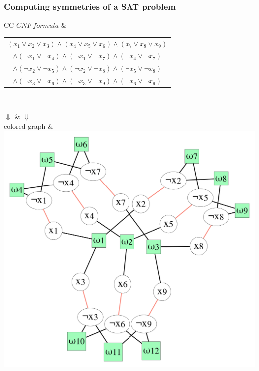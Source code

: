 \documentclass{beamer}
\begin{document}
\begin{frame}
\frametitle{Computing symmetries of a SAT problem}

\begin{tabular}{CC}
	$CNF\ formula$ &{\scriptsize
		\begin{tabular}{c}
			$(x_1 \lor x_2 \lor x_3) \land
			(x_4 \lor x_5 \lor x_6) \land
			(x_7 \lor x_8 \lor x_9) $\\
			$\land (\neg x_1 \lor \neg x_4) \land
			(\neg x_1 \lor \neg x_7) \land
			(\neg x_4 \lor \neg x_7)$\\
			$\land (\neg x_2 \lor \neg x_5) \land
			(\neg x_2 \lor \neg x_8) \land
			(\neg x_5 \lor \neg x_8)$ \\
			$\land (\neg x_3 \lor \neg x_6) \land
			(\neg x_3 \lor \neg x_9) \land
			(\neg x_6 \lor \neg x_9)$\\
	\end{tabular}}\\
	\only<2> {
		
		$\Downarrow$ & $\Downarrow$  \\
		
		colored graph & 
		\includegraphics[scale=0.1]{images/graph}\\ \\
	}
	

\end{tabular}
\end{frame}
\end{document}
